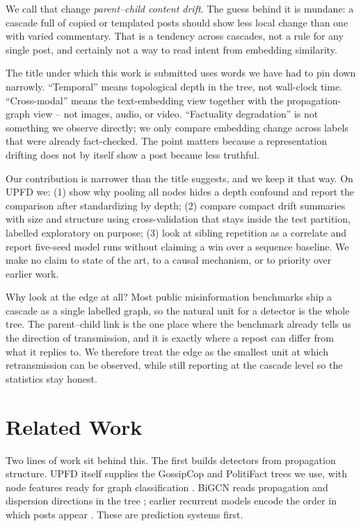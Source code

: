 \documentclass[conference]{IEEEtran}
\begin{document}
We call that change \emph{parent--child content drift}. The guess behind it is
mundane: a cascade full of copied or templated posts should show less local
change than one with varied commentary. That is a tendency across cascades, not
a rule for any single post, and certainly not a way to read intent from
embedding similarity.

The title under which this work is submitted uses words we have had to pin down
narrowly. ``Temporal'' means topological depth in the tree, not wall-clock time.
``Cross-modal'' means the text-embedding view together with the
propagation-graph view -- not images, audio, or video. ``Factuality
degradation'' is not something we observe directly; we only compare embedding
change across labels that were already fact-checked. The point matters because a
representation drifting does not by itself show a post became less truthful.

Our contribution is narrower than the title suggests, and we keep it that way.
On UPFD \cite{dou2021upfd} we: (1) show why pooling all nodes hides a depth
confound and report the comparison after standardizing by depth; (2) compare
compact drift summaries with size and structure using cross-validation that
stays inside the test partition, labelled exploratory on purpose; (3) look at
sibling repetition as a correlate and report five-seed model runs without
claiming a win over a sequence baseline. We make no claim to state of the art,
to a causal mechanism, or to priority over earlier work.

Why look at the edge at all? Most public misinformation benchmarks ship a
cascade as a single labelled graph, so the natural unit for a detector is the
whole tree. The parent--child link is the one place where the benchmark already
tells us the direction of transmission, and it is exactly where a repost can
differ from what it replies to. We therefore treat the edge as the smallest
unit at which retransmission can be observed, while still reporting at the
cascade level so the statistics stay honest.

\section{Related Work}
Two lines of work sit behind this. The first builds detectors from propagation
structure. UPFD itself supplies the GossipCop and PolitiFact trees we use, with
node features ready for graph classification \cite{dou2021upfd}. BiGCN reads
propagation and dispersion directions in the tree \cite{bian2020bigcn}; earlier
recurrent models encode the order in which posts appear \cite{ma2016recurrent}.
These are prediction systems first.
\end{document}
